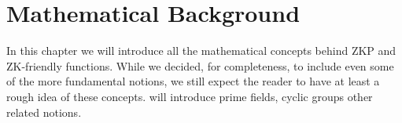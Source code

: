 \chapter{Mathematical Background}\label{chap:math}
In this chapter we will introduce all the mathematical concepts behind ZKP and ZK-friendly 
functions.
While we decided, for completeness, to include even some of the more fundamental notions, we still
expect the reader to have at least a rough idea of these concepts.
 will introduce prime fields, cyclic groups other related notions.  



